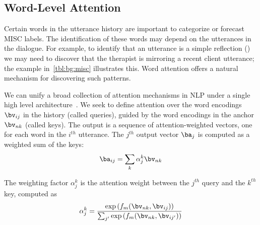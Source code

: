 \subsection{Word-Level Attention}
\label{ssec:word_att}

Certain words in the utterance history are important to categorize or
forecast MISC labels. The identification of these words may depend on
the utterances in the dialogue. For example, to identify that an
utterance is a simple reflection (\RES) we may need to discover that
the therapist is mirroring a recent client utterance; the example
in~\autoref{tbl:bg:misc} illustrates this. Word attention offers a
natural mechanism for discovering such patterns.


We can unify a broad collection of attention mechanisms in NLP under
a single high level architecture~\citep{galassi2019attention}. We
seek to define attention over the word encodings $\bv_{ij}$ in the
history (called queries), guided by the word encodings in the anchor
$\bv_{nk}$ (called keys). The output is a sequence of
attention-weighted vectors, one for each word in the $i^{th}$
utterance.  The $j^{th}$ output vector $\ba_j$ is computed as a
weighted sum of the keys:
\begin{equation}
  \ba_{ij} = \sum_{k} \alpha^{k}_{j} \bv_{nk}
\label{eq:att_sum}
\end{equation}

The weighting factor $\alpha^k_j$ is the attention weight between
the $j^{th}$ query and the $k^{th}$ key, computed as
\begin{equation}
\label{eq:att_weight}
\alpha^{k}_{j} = \frac{\exp\left(f_{m}(\bv_{nk}, \bv_{ij})\right)}{\sum_{j^{\prime}} \exp\left(f_{m}(\bv_{nk}, \bv_{ij^\prime})\right)}
\end{equation}

